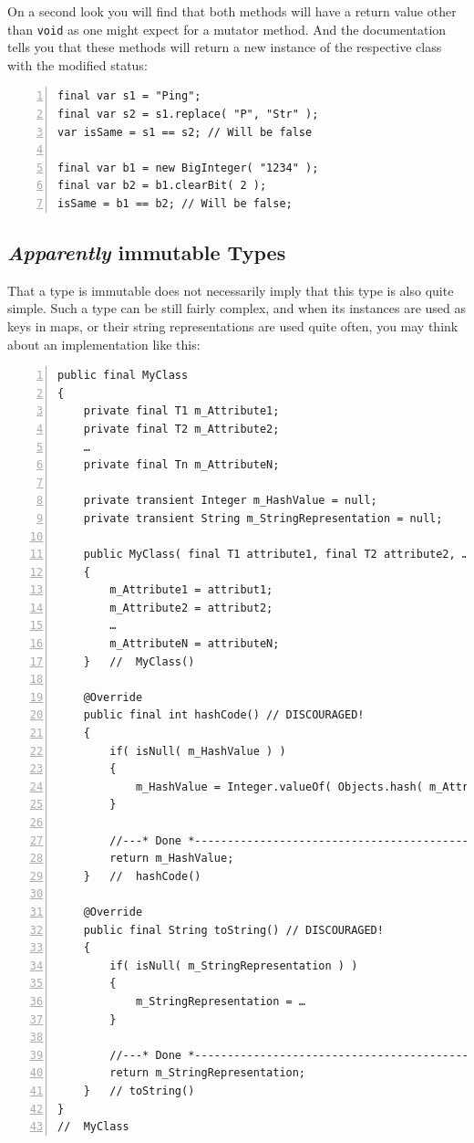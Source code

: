 \documentclass[11pt,a4paper, titlepage, parskip=half, headsepline, footsepline, cleardoublepage=current, headheight=1cm]{scrbook}
\begin{document}
On a second look you will find that both methods will have a return value other than \lstinline|void| as one might expect for a mutator method. And the documentation tells you that these methods will return a new instance of the respective class with the modified status:
\begin{lstlisting}[numbers=left]
final var s1 = "Ping";
final var s2 = s1.replace( "P", "Str" );
var isSame = s1 == s2; // Will be false

final var b1 = new BigInteger( "1234" );
final var b2 = b1.clearBit( 2 );
isSame = b1 == b2; // Will be false;
\end{lstlisting}


\subsection{\textit{Apparently} immutable Types}
That a type is immutable does not necessarily imply that this type is also quite simple. Such a type can be still fairly complex, and when its instances are used as keys in maps, or their string representations are used quite often, you may think about an implementation like this:
\begin{lstlisting}[numbers=left]
public final MyClass
{
    private final T1 m_Attribute1;
    private final T2 m_Attribute2;
    …
    private final Tn m_AttributeN;
    
    private transient Integer m_HashValue = null;
    private transient String m_StringRepresentation = null;

    public MyClass( final T1 attribute1, final T2 attribute2, …, Tn attributeN )
    {
        m_Attribute1 = attribut1;
        m_Attribute2 = attribut2;
        …
        m_AttributeN = attributeN;
    }   //  MyClass()
    
    @Override    
    public final int hashCode() // DISCOURAGED!
    {
        if( isNull( m_HashValue ) )
        {
            m_HashValue = Integer.valueOf( Objects.hash( m_Attribute1, m_Attribute2, …, m_AttributeN );
        }    
        
        //---* Done *------------------------------------------------
        return m_HashValue;
    }   //  hashCode()
    
    @Override
    public final String toString() // DISCOURAGED!
    {
        if( isNull( m_StringRepresentation ) )
        {
            m_StringRepresentation = …
        }
        
        //---* Done *------------------------------------------------
        return m_StringRepresentation;
    }   // toString()
}
//  MyClass    
\end{lstlisting}
\end{document}

